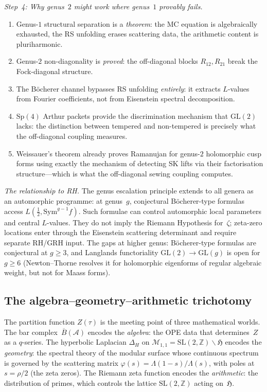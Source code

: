 \documentclass[11pt]{article}
\newcommand{\cA}{\mathcal{A}}
\newcommand{\cM}{\mathcal{M}}
\newcommand{\barB}{\overline{B}}
\newcommand{\bZ}{\mathbb{Z}}
\begin{document}
\emph{Step~4: Why genus~$2$ might work where genus~$1$
provably fails.}
\begin{enumerate}[label=\textup{(\arabic*)}]
\item Genus-$1$ structural separation is a \emph{theorem}:
  the MC equation is algebraically exhausted, the RS unfolding
  erases scattering data, the arithmetic content is
  pluriharmonic.
\item Genus-$2$ non-diagonality is \emph{proved}: the
  off-diagonal blocks $R_{12}, R_{21}$ break the
  Fock-diagonal structure.
\item The B\"ocherer channel bypasses RS unfolding
  \emph{entirely}: it extracts $L$-values from Fourier
  coefficients, not from Eisenstein spectral decomposition.
\item $\mathrm{Sp}(4)$ Arthur packets provide the
  discrimination mechanism that $\mathrm{GL}(2)$ lacks: the
  distinction between tempered and non-tempered is precisely
  what the off-diagonal coupling measures.
\item Weissauer's theorem already proves Ramanujan for
  genus-$2$ holomorphic cusp forms using exactly the mechanism
  of detecting SK lifts via their factorisation structure---which
  is what the off-diagonal sewing coupling computes.
\end{enumerate}

\emph{The relationship to RH.}
The genus escalation principle extends to all genera as an
automorphic programme: at genus~$g$, conjectural
B\"ocherer-type formulas access
$L(\tfrac{1}{2}, \mathrm{Sym}^{g-1}f)$.  Such formulae can control
automorphic local parameters and central $L$-values.  They do not
imply the Riemann Hypothesis for~$\zeta$; zeta-zero locations enter
through the Eisenstein scattering determinant and require separate
RH/GRH input.  The gaps at higher genus: B\"ocherer-type formulas are
conjectural at $g \geq 3$, and Langlands functoriality
$\mathrm{GL}(2) \to \mathrm{GL}(g)$ is open for $g \geq 6$
(Newton--Thorne resolves it for holomorphic eigenforms of
regular algebraic weight, but not for Maass forms).

\subsection{The algebra--geometry--arithmetic trichotomy}
\label{sec:alg-geom-arith-vol1}

The partition function $Z(\tau)$ is the meeting point of three
mathematical worlds.  The bar complex~$\barB(\cA)$ encodes the
\emph{algebra}: the OPE data that determines~$Z$ as a
$q$-series.  The hyperbolic Laplacian $\Delta_H$ on
$\cM_{1,1} = \mathrm{SL}(2,\bZ)\backslash\mathfrak{H}$
encodes the \emph{geometry}: the spectral theory of the
modular surface whose continuous spectrum is governed by the
scattering matrix $\varphi(s) = \Lambda(1{-}s)/\Lambda(s)$,
with poles at $s = \rho/2$ (the zeta zeros).  The Riemann
zeta function encodes the \emph{arithmetic}: the distribution
of primes, which controls the lattice
$\mathrm{SL}(2,\bZ)$ acting on~$\mathfrak{H}$.
\end{document}
